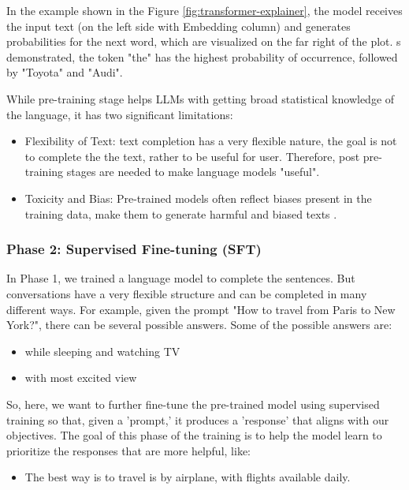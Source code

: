 In the example shown in the Figure \ref{fig:transformer-explainer}, the model receives the input text 
(on the left side with Embedding column) and generates probabilities 
for the next word, which are visualized on the far right of the plot. 
s demonstrated, the token "the" has the highest probability of occurrence, 
followed by "Toyota" and "Audi".



While pre-training stage helps LLMs with getting broad statistical knowledge of the language, 
it has two significant limitations:


\begin{itemize}
    \item Flexibility of Text: text completion has a very flexible nature, 
    the goal is not to complete the the text, rather to be useful for user. 
    Therefore, post pre-training stages are needed to make language models "useful".
    \item Toxicity and Bias: Pre-trained models often reflect biases present in the training data, 
    make them to generate harmful and biased texts \cite{ouyangTrainingLanguageModels2022}.
\end{itemize}


\subsubsection{Phase 2: Supervised Fine-tuning (SFT)} \label{subsubsec:sft}

In Phase 1, we trained a language model to complete the sentences. 
But conversations have a very flexible structure and can be completed in many different ways. 
For example, given the prompt "How to travel from Paris to New York?", 
there can be several possible answers. Some of the possible answers are:

\begin{itemize}
    \item while sleeping and watching TV
    \item with most excited view
\end{itemize}

So, here, we want to further fine-tune the pre-trained model using supervised training 
so that, given a 'prompt,' it produces a 'response' that aligns with our objectives. The goal of this phase of the training is to help the model learn to prioritize the responses that are more helpful, like:

\begin{itemize}
    \item The best way is to travel is by airplane, with flights available daily.
\end{itemize}

